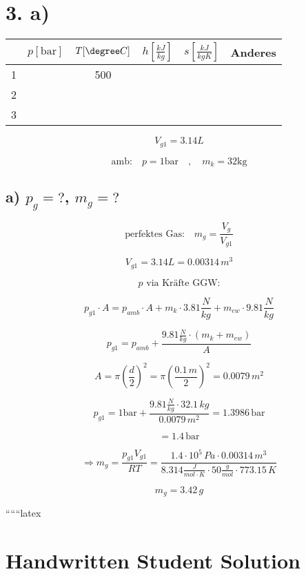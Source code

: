 \section*{3. a)}

\begin{tabular}{|c|c|c|c|c|c|}
\hline
 & $p[\text{bar}]$ & $T[\degree C]$ & $h\left[\frac{kJ}{kg}\right]$ & $s\left[\frac{kJ}{kgK}\right]$ & Anderes \\
\hline
1 & & 500 & & & \\
\hline
2 & & & & & \\
\hline
3 & & & & & \\
\hline
\end{tabular}

\[
V_{g1} = 3.14L
\]

\[
\text{amb:} \quad p = 1 \text{bar} \quad , \quad m_k = 32 \text{kg}
\]

\subsection*{a) $p_{g} = ?$, $m_{g} = ?$}

\[
\text{perfektes Gas:} \quad m_{g} = \frac{V_{g}}{V_{g1}}
\]

\[
V_{g1} = 3.14L = 0.00314 \, m^3
\]

\[
p \text{ via Kräfte GGW:}
\]

\[
p_{g1} \cdot A = p_{amb} \cdot A + m_k \cdot 3.81 \frac{N}{kg} + m_{ew} \cdot 9.81 \frac{N}{kg}
\]

\[
p_{g1} = p_{amb} + \frac{9.81 \frac{N}{kg} \cdot (m_k + m_{ew})}{A}
\]

\[
A = \pi \left(\frac{d}{2}\right)^2 = \pi \left(\frac{0.1 \, m}{2}\right)^2 = 0.0079 \, m^2
\]

\[
p_{g1} = 1 \text{bar} + \frac{9.81 \frac{N}{kg} \cdot 32.1 \, kg}{0.0079 \, m^2} = 1.3986 \, \text{bar}
\]

\[
= 1.4 \, \text{bar}
\]

\[
\Rightarrow \boxed{m_{g} = \frac{p_{g1} V_{g1}}{RT} = \frac{1.4 \cdot 10^5 \, Pa \cdot 0.00314 \, m^3}{8.314 \frac{J}{mol \cdot K} \cdot 50 \frac{g}{mol} \cdot 773.15 \, K}}
\]

\[
m_{g} = 3.42 \, g
\]

``````latex


\section*{Handwritten Student Solution}

